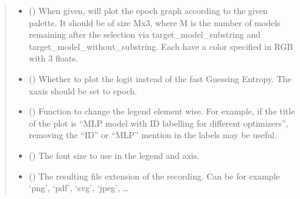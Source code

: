 \documentclass[letterpaper,10pt,english]{sphinxmanual}
\begin{document}
\begin{fulllineitems}
\begin{fulllineitems}
\begin{quote}
\begin{description}
\begin{itemize}
\item {} 
\sphinxAtStartPar
{} (\sphinxstyleliteralemphasis{\sphinxupquote{{[}}}\sphinxstyleliteralemphasis{\sphinxupquote{{[}}}\sphinxstyleliteralemphasis{\sphinxupquote{{]}}}\sphinxstyleliteralemphasis{\sphinxupquote{{]}}}\sphinxstyleliteralemphasis{\sphinxupquote{, }}) \textendash{} When given, will plot the epoch graph according to the given palette. It should be of size Mx3, where M
is the number of models remaining after the selection via target\_model\_substring and
target\_model\_without\_substring. Each have a color specified in RGB with 3 floats.

\item {} 
\sphinxAtStartPar
{} (\sphinxstyleliteralemphasis{\sphinxupquote{, }}) \textendash{} Whether to plot the logit instead of the fast Guessing Entropy. The x\sphinxhyphen{}axis should be set to epoch.

\item {} 
\sphinxAtStartPar
{} (\sphinxstyleliteralemphasis{\sphinxupquote{, }}) \textendash{} Function to change the legend element wise. For example, if the title of the plot is “MLP model with ID
labelling for different optimizers”, removing the “ID” or “MLP” mention in the labels may be useful.

\item {} 
\sphinxAtStartPar
{} (\sphinxstyleliteralemphasis{\sphinxupquote{, }}) \textendash{} The font size to use in the legend and axis.

\item {} 
\sphinxAtStartPar
{} (\sphinxstyleliteralemphasis{\sphinxupquote{, }}) \textendash{} The resulting file extension of the recording. Can be for example ‘png’, ‘pdf’, ‘svg’, ‘jpeg’, …


\end{itemize}
\end{description}
\end{quote}
\end{fulllineitems}
\end{fulllineitems}
\end{document}

